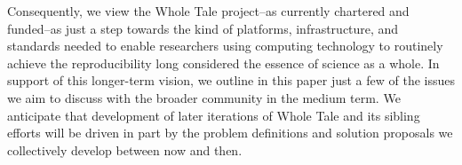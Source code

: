 Consequently, we view the Whole Tale project--as currently chartered and funded--as just a step
	towards the kind of platforms, infrastructure, and standards
	needed to enable researchers using computing technology to routinely 
	achieve the reproducibility long considered the essence of science as a whole.
In support of this longer-term vision, we outline in this paper just a few of the issues
	we aim to discuss with the broader community in the medium term.
We anticipate that development of later iterations of Whole Tale and its sibling efforts 
	will be driven in part by the problem definitions and solution proposals we collectively
	develop between now and then.

 
